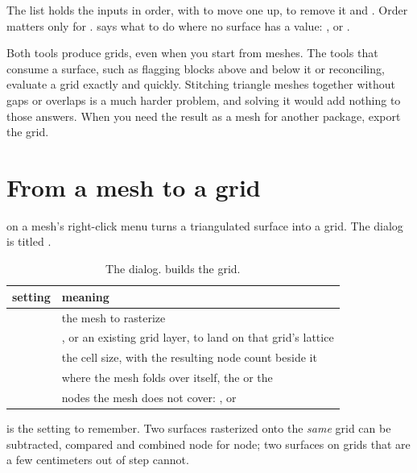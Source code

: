 The  list holds the inputs in order, with  to move one up,  to remove it and . Order matters only for .  says what to do where no surface has a value: ,  or .

\begin{why}
Both tools produce grids, even when you start from meshes. The tools that consume a surface, such as flagging blocks above and below it or reconciling, evaluate a grid exactly and quickly. Stitching triangle meshes together without gaps or overlaps is a much harder problem, and solving it would add nothing to those answers. When you need the result as a mesh for another package, export the grid.
\end{why}

\section{From a mesh to a grid}\label{sec:grids-rasterize}

 on a mesh's right-click menu turns a triangulated surface into a grid. The dialog is titled .

\begin{table}[htbp]
\small
\begin{tabularx}{\linewidth}{@{}lL@{}}\toprule
setting & meaning \\ \midrule
{} & the mesh to rasterize \\
 & , or  an existing grid layer, to land on that grid's lattice \\
 & the cell size, with the resulting node count beside it \\
 & where the mesh folds over itself, the  or the  \\
 & nodes the mesh does not cover: ,  or  \\
\bottomrule
\end{tabularx}
\caption{The  dialog.  builds the grid.}\label{tab:grids-rasterize}
\end{table}

 is the setting to remember. Two surfaces rasterized onto the \emph{same} grid can be subtracted, compared and combined node for node; two surfaces on grids that are a few centimeters out of step cannot.

